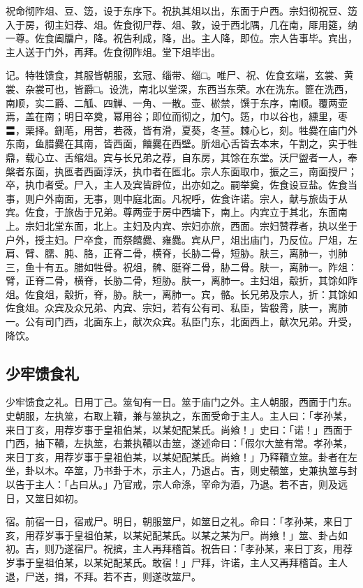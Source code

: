 \documentclass[]{article}
\begin{document}
祝命彻阼俎、豆、笾，设于东序下。祝执其俎以出，东面于户西。宗妇彻祝豆、笾入于房，彻主妇荐、俎。佐食彻尸荐、俎、敦，设于西北隅，几在南，厞用筵，纳一尊。佐食阖牖户，降。祝告利成，降，出。主人降，即位。宗人告事毕。宾出，主人送于门外，再拜。佐食彻阼俎。堂下俎毕出。

记。特牲馈食，其服皆朝服，玄冠、缁带、缁□。唯尸、祝、佐食玄端，玄裳、黄裳、杂裳可也，皆爵□。设洗，南北以堂深，东西当东荣。水在洗东。篚在洗西，南顺，实二爵、二觚、四觯、一角、一散。壶、棜禁，馔于东序，南顺。覆两壶焉，盖在南；明日卒奠，幂用谷；即位而彻之，加勺。笾，巾以谷也，纁里，枣〓，栗择。鉶芼，用苦，若薇，皆有滑，夏葵，冬荁。棘心匕，刻。牲爨在庙门外东南，鱼腊爨在其南，皆西面，饎爨在西壁。肵俎心舌皆去本末，午割之，实于牲鼎，载心立、舌缩俎。宾与长兄弟之荐，自东房，其馀在东堂。沃尸盥者一人，奉槃者东面，执匜者西面淳沃，执巾者在匜北。宗人东面取巾，振之三，南面授尸；卒，执巾者受。尸入，主人及宾皆辟位，出亦如之。嗣举奠，佐食设豆盐。佐食当事，则户外南面，无事，则中庭北面。凡祝呼，佐食许诺。宗人，献与旅齿于从宾。佐食，于旅齿于兄弟。尊两壶于房中西墉下，南上。内宾立于其北，东面南上。宗妇北堂东面，北上。主妇及内宾、宗妇亦旅，西面。宗妇赞荐者，执以坐于户外，授主妇。尸卒食，而祭饎爨、雍爨。宾从尸，俎出庙门，乃反位。尸俎，左肩、臂、臑、肫、胳，正脊二骨，横脊，长胁二骨，短胁。肤三，离肺一，刌肺三，鱼十有五。腊如牲骨。祝俎，髀、脡脊二骨，胁二骨。肤一，离肺一。阼俎：臂，正脊二骨，横脊，长胁二骨，短胁。肤一，离肺一。主妇俎，觳折，其馀如阼俎。佐食俎，觳折，脊，胁。肤一，离肺一。宾，骼。长兄弟及宗人，折：其馀如佐食俎。众宾及众兄弟、内宾、宗妇，若有公有司、私臣，皆殽脀，肤一，离肺一。公有司门西，北面东上，献次众宾。私臣门东，北面西上，献次兄弟。升受，降饮。

\hypertarget{header-n72}{%
\subsection{少牢馈食礼}\label{header-n72}}

少牢馈食之礼。日用丁己。筮旬有一日。筮于庙门之外。主人朝服，西面于门东。史朝服，左执筮，右取上韇，兼与筮执之，东面受命于主人。主人曰：「孝孙某，来日丁亥，用荐岁事于皇祖伯某，以某妃配某氏。尚飨！」史曰：「诺！」西面于门西，抽下韇，左执筮，右兼执韇以击筮，遂述命曰：「假尔大筮有常。孝孙某，来日丁亥，用荐岁事于皇祖伯某，以某妃配某氏。尚飨！」乃释韇立筮。卦者在左坐，卦以木。卒筮，乃书卦于木，示主人，乃退占。吉，则史韇筮，史兼执筮与封以告于主人：「占曰从。」乃官戒，宗人命涤，宰命为酒，乃退。若不吉，则及远日，又筮日如初。

宿。前宿一日，宿戒尸。明日，朝服筮尸，如筮日之礼。命曰：「孝孙某，来日丁亥，用荐岁事于皇祖伯某，以某妃配某氏。以某之某为尸。尚飨！」筮、卦占如初。吉，则乃遂宿尸。祝摈，主人再拜稽首。祝告曰：「孝孙某，来日丁亥，用荐岁事于皇祖伯某，以某妃配某氏。敢宿！」尸拜，许诺，主人又再拜稽首。主人退，尸送，揖，不拜。若不吉，则遂改筮尸。
\end{document}

